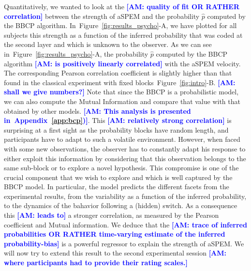 \documentclass[12pt,english]{article}%
\newcommand{\seeFig}[1]{Figure~\ref{fig:#1}}
\newcommand{\seeApp}[1]{Appendix~\ref{app:#1}}
\newcommand{\AM}[1]{\textbf{\textcolor{blue}{[AM: #1]}}}
\begin{document}
Quantitatively, we wanted to look at the \AM{quality of fit OR RATHER correlation}
between the strength of aSPEM and
the probability $\hat{p}$ computed by the BBCP algorithm.
In~\seeFig{results_psycho}-A, we have plotted for all subjects
this strength as a function of the inferred probability
that was coded at the second layer and which is unknown to the observer.
As we can see in~\seeFig{results_psycho}-A,
the probability $\hat{p}$ computed by the BBCP algorithm
\AM{is positively linearly correlated} with the aSPEM velocity.
The corresponding Pearson correlation coefficient
is slightly higher than that found in
the classical experiment with fixed blocks~\seeFig{intro}-B. \AM{shall we give numbers?}
Note that since the BBCP is a probabilistic model,
we can also compute the Mutual Information and
compare that value with that obtained by other models. \AM{This analysis is presented in~\seeApp{bcp})}.
This \AM{relatively strong correlation} is surprising at a first sight as the probability blocks have random length,
and participants have to adapt to such a volatile environment.
However, when faced with some new observations,
the observer has to constantly adapt his response
to either exploit this information by considering that
this observation belongs to the same sub-block or to explore
a novel hypothesis.
This compromise is one of the crucial component that we wish to explore
and which is well captured by the BBCP model.
In particular, the model predicts the different facets
from the experimental results,
from the variability as a function of the inferred probability,
to the dynamics of the bahavior following a (hidden) switch.
As a consequence this \AM{leads to} a stronger correlation,
as measured by the Pearson coefficient and Mutual information.
We deduce that the \AM{trace of inferred probabilities OR RATHER time-varying estimate of the inferred probability-bias} is a powerful regressor
to explain the strength of aSPEM.
We will now try to extend this result
to the second experimental session \AM{where participants had to provide their rating scales.}
\end{document}
